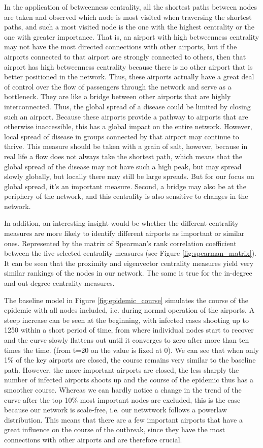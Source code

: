 \documentclass{Resources/netsci-project}
\begin{document}
In the application of betweenness centrality, all the shortest paths between nodes are taken and observed which node is most visited when traversing the shortest paths, and such a most visited node is the one with the highest centrality or the one with greater importance. That is, an airport with high betweenness centrality may not have the most directed connections with other airports, but if the airports connected to that airport are strongly connected to others, then that airport has high betweenness centrality because there is no other airport that is better positioned in the network. Thus, these airports actually have a great deal of control over the flow of passengers through the network and serve as a bottleneck. They are like a bridge between other airports that are highly interconnected. Thus, the global spread of a disease could be limited by closing such an airport. Because these airports provide a pathway to airports that are otherwise inaccessible, this has a global impact on the entire network. However, local spread of disease in groups connected by that airport may continue to thrive. This measure should be taken with a grain of salt, however, because in real life a flow does not always take the shortest path, which means that the global spread of the disease may not have such a high peak, but may spread slowly globally, but locally there may still be large spreads. But for our focus on global spread, it's an important measure. Second, a bridge may also be at the periphery of the network, and this centrality is also sensitive to changes in the network.

In addition, an interesting insight would be whether the different centrality measures are more likely to identify different airports as important or similar ones. Represented by the matrix of Spearman's rank correlation coefficient between the five selected centrality measures (see Figure \ref{fig:spearman_matrix}). It can be seen that the proximity and eigenvector centrality measures yield very similar rankings of the nodes in our network. The same is true for the in-degree and out-degree centrality measures.

The baseline model in Figure \ref{fig:epidemic_course} simulates the course of the epidemic with all nodes included, i.e. during normal operation of the airports. A steep increase can be seen at the beginning, with infected cases shooting up to 1250 within a short period of time, from where individual nodes start to recover and the curve slowly flattens out until it converges to zero after more than ten times the time. (from t=20 on the value is fixed at 0).
We can see that when only 1\% of the key airports are closed, the course remains very similar to the baseline path. However, the more important airports are closed, the less sharply the number of infected airports shoots up and the course of the epidemic thus has a smoother course. Whereas we can hardly notice a change in the trend of the curve after the top 10\% most important nodes are excluded, this is the case because our network is scale-free, i.e. our netwtwork follows a powerlaw distribution. This means that 
there are a few important airports that have a great influence on the course of the outbreak, since they have the most connections with other airports and are therefore crucial.
\end{document}
